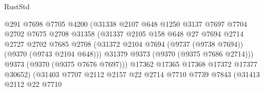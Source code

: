 \begin{lexlean}{RustStd}
\begin{coremodule}
{\begin{coremodule}
{{{{{{{{{{{{{{{{{{{{{{{{{{{{{{{{{{{{{{{                                      @291
                                      @7698
                                      @7705
                                      @4200
                                      (@31338
                                        @2107
                                        @648
                                        @1250
                                        @3137
                                        @7697
                                        @7704
                                        @2702
                                        @7675
                                        @2708
                                        @31358
                                        (@31337
                                          @2105
                                          @158
                                          @648
                                          @27
                                          @7694
                                          @2714
                                          @2727
                                          @2702
                                          @7685
                                          @2708
                                          (@31372
                                            @2104
                                            @7694
                                            (@9737 (@9738 @7694))
                                            (@9370 (@9743 @2104 @648)))
                                          @31379
                                          @9373
                                          (@9370 (@9375 @7686 @2714)))
                                        @9373
                                        (@9370 (@9375 @7676 @7697)))
                                      @17362
                                      @17365
                                      @17368
                                      @17372
                                      @17377
                                      @30652)
                                    (@31403
                                      @7707
                                      @2112
                                      @2157
                                      @22
                                      @2714
                                      @7710
                                      @7739
                                      @7843
                                      (@31413
                                        @2112
                                        @22
                                        @7710
}}}}}}}}}}}}}}}}}}}}}}}}}}}}}}}}}}}}}}}
\end{coremodule}}
\end{coremodule}
\end{lexlean}
